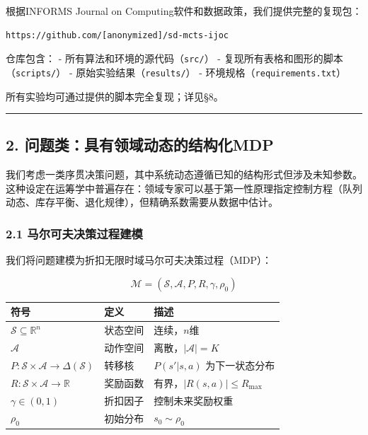 \documentclass[UTF8]{ctexart}
\begin{document}
根据INFORMS Journal on Computing软件和数据政策，我们提供完整的复现包：

\begin{verbatim}
https://github.com/[anonymized]/sd-mcts-ijoc
\end{verbatim}

仓库包含： - 所有算法和环境的源代码（\texttt{src/}） -
复现所有表格和图形的脚本（\texttt{scripts/}） -
原始实验结果（\texttt{results/}） -
环境规格（\texttt{requirements.txt}）

所有实验均可通过提供的脚本完全复现；详见§8。

\begin{center}\rule{0.5\linewidth}{0.4pt}\end{center}

\hypertarget{ux95eeux9898ux7c7bux5177ux6709ux9886ux57dfux52a8ux6001ux7684ux7ed3ux6784ux5316mdp}{%
\subsection{2.
问题类：具有领域动态的结构化MDP}\label{ux95eeux9898ux7c7bux5177ux6709ux9886ux57dfux52a8ux6001ux7684ux7ed3ux6784ux5316mdp}}

我们考虑一类序贯决策问题，其中系统动态遵循已知的结构形式但涉及未知参数。这种设定在运筹学中普遍存在：领域专家可以基于第一性原理指定控制方程（队列动态、库存平衡、退化规律），但精确系数需要从数据中估计。

\hypertarget{ux9a6cux5c14ux53efux592bux51b3ux7b56ux8fc7ux7a0bux5efaux6a21}{%
\subsubsection{2.1
马尔可夫决策过程建模}\label{ux9a6cux5c14ux53efux592bux51b3ux7b56ux8fc7ux7a0bux5efaux6a21}}

我们将问题建模为折扣无限时域马尔可夫决策过程（MDP）：

\[\mathcal{M} = (\mathcal{S}, \mathcal{A}, P, R, \gamma, \rho_0)\]

\begin{table}[h]
\centering
\begin{tabular}{p{3cm}p{3cm}p{8cm}}
\toprule
\textbf{符号} & \textbf{定义} & \textbf{描述} \\
\midrule
$\mathcal{S} \subseteq \mathbb{R}^n$ & 状态空间 & 连续，$n$维 \\
$\mathcal{A}$ & 动作空间 & 离散，$\lvert\mathcal{A}\rvert = K$ \\
$P: \mathcal{S} \times \mathcal{A} \to \Delta(\mathcal{S})$ & 转移核 & $P(s'\lvert s,a)$ 为下一状态分布 \\
$R: \mathcal{S} \times \mathcal{A} \to \mathbb{R}$ & 奖励函数 & 有界，$\lvert R(s,a)\rvert \leq R_{\max}$ \\
$\gamma \in (0,1)$ & 折扣因子 & 控制未来奖励权重 \\
$\rho_0$ & 初始分布 & $s_0 \sim \rho_0$ \\
\bottomrule
\end{tabular}
\end{table}
\end{document}
